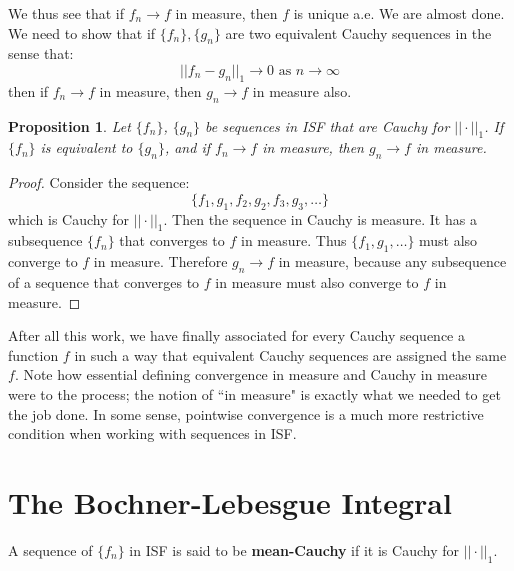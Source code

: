 \documentclass[a4paper,12pt]{report}
\newtheorem{prop}[theorem]{Proposition}
\newenvironment{definition}[1][Definition.]{\begin{trivlist}
\item[\hskip \labelsep {\bfseries #1}]}{\end{trivlist}}
\begin{document}
	\noindent We thus see that if $f_n \rightarrow f$ in measure, then $f$ is unique a.e. We are almost done. We need to show that if $\{f_n\}, \{g_n\}$ are two equivalent Cauchy sequences in the sense that:
	\[ ||f_n - g_n||_1 \rightarrow 0 \text{ as } n \rightarrow \infty \]
	then if $f_n \rightarrow f$ in measure, then $g_n \rightarrow f$ in measure also. 
	
	\begin{prop}
	Let $\{f_n\}$, $\{g_n\}$ be sequences in ISF that are Cauchy for $||\cdot||_1$. If $\{f_n\}$ is equivalent to $\{g_n\}$, and if $f_n \rightarrow f$ in measure, then $g_n \rightarrow f$ in measure.
	\end{prop}
	\begin{proof}
	Consider the sequence:
	\[ \{f_1, g_1, f_2, g_2, f_3, g_3, \ldots \} \]
	which is Cauchy for $||\cdot||_1$. Then the sequence in Cauchy is measure. It has a subsequence $\{f_n\}$ that converges to $f$ in measure. Thus $\{f_1, g_1, \ldots \}$ must also converge to $f$ in measure. Therefore $g_n \rightarrow f$ in measure, because any subsequence of a sequence that converges to $f$ in measure must also converge to $f$ in measure. 
	\end{proof}
	
	\noindent After all this work, we have finally associated for every Cauchy sequence a function $f$ in such a way that equivalent Cauchy sequences are assigned the same $f$. Note how essential defining convergence in measure and Cauchy in measure were to the process; the notion of ``in measure" is exactly what we needed to get the job done. In some sense, pointwise convergence is a much more restrictive condition when working with sequences in ISF. 
	
	\section{The Bochner-Lebesgue Integral}
	
	\begin{definition}
	A sequence of $\{f_n\}$ in ISF is said to be \textbf{mean-Cauchy} if it is Cauchy for $||\cdot||_1$. 
	\end{definition}
	
\end{document}
